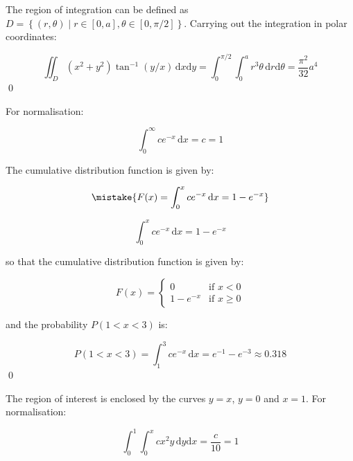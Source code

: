 \documentclass[12pt]{article}
\begin{document}
The region of integration can be defined as $D = \left\{ (r, \theta) \mid r \in [0, a], \theta \in [0, \pi/2] \right\}$. Carrying out the integration in polar coordinates:

\begin{equation}
    \iint_{D} (x^{2} + y^{2}) \tan^{-1}{(y/x)} \, \mathrm{d}x \mathrm{d}y = \int_{0}^{\pi/2} \int_{0}^{a} r^{3} \theta \, \mathrm{d}r \mathrm{d}\theta = \frac{\pi^{2}}{32} a^{4}
\end{equation}
\qed


For normalisation:

\begin{equation}
    \int_{0}^{\infty} c e^{-x} \, \mathrm{d}x = c = 1
\end{equation}

The cumulative distribution function is given by:

\begin{equation}
    \mistake{F(x) = \int_{0}^{x} c e^{-x} \, \mathrm{d}x = 1 - e^{-x}}
\end{equation}

\begin{correction}
    \begin{equation}
        \int_{0}^{x} c e^{-x} \, \mathrm{d}x = 1 - e^{-x}
    \end{equation}

    so that the cumulative distribution function is given by:

    \begin{equation}
        F(x) =
        \begin{cases}
            0          & \text{if } x < 0    \\
            1 - e^{-x} & \text{if } x \geq 0
        \end{cases}
    \end{equation}
\end{correction}

and the probability $P(1 < x < 3)$ is:

\begin{equation}
    P(1 < x < 3) = \int_{1}^{3} c e^{-x} \, \mathrm{d}x = e^{-1} - e^{-3} \approx 0.318
\end{equation}
\qed


The region of interest is enclosed by the curves $y = x$, $y = 0$ and $x = 1$. For normalisation:

\begin{equation}
    \int_{0}^{1} \int_{0}^{x} cx^{2}y \, \mathrm{d}y \mathrm{d}x = \frac{c}{10} = 1
\end{equation}
\end{document}
